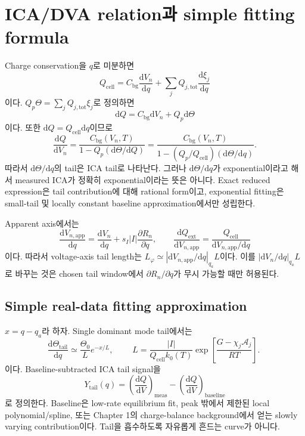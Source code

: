 \documentclass[11pt,a4paper]{article}
\newcommand{\dd}{\mathrm{d}}
\newcommand{\app}{\mathrm{app}}
\newcommand{\bg}{\mathrm{bg}}
\newcommand{\cell}{\mathrm{cell}}
\newcommand{\ext}{\mathrm{ext}}
\newcommand{\tot}{\mathrm{tot}}
\newcommand{\tail}{\mathrm{tail}}
\begin{document}
\section{ICA/DVA relation과 simple fitting formula}\label{sec:fiteq}
Charge conservation을 $q$로 미분하면
\begin{equation}
Q_{\cell}=C_{\bg}\frac{\dd V_n}{\dd q}+\sum_jQ_{j,\tot}\frac{\dd\xi_j}{\dd q}
\end{equation}
이다. $Q_p\Theta=\sum_jQ_{j,\tot}\xi_j$로 정의하면
\begin{equation}
\dd Q=C_{\bg}\dd V_n+Q_p\dd\Theta
\label{eq:dQsplit}
\end{equation}
이다. 또한 $\dd Q=Q_{\cell}\dd q$이므로
\begin{equation}
\boxed{\;\frac{\dd Q}{\dd V_n}=\frac{C_{\bg}(V_n,T)}{1-Q_p(\dd\Theta/\dd Q)}
=\frac{C_{\bg}(V_n,T)}{1-(Q_p/Q_{\cell})(\dd\Theta/\dd q)}.\;}
\label{eq:fiteq}
\end{equation}
따라서 $\dd\Theta/\dd q$의 tail은 ICA tail로 나타난다. 그러나 $\dd\Theta/\dd q$가 exponential이라고 해서 measured ICA가
정확히 exponential이라는 뜻은 아니다. Exact reduced expression은 tail contribution에 대해 rational form이고, exponential fitting은
small-tail 및 locally constant baseline approximation에서만 성립한다.

Apparent axis에서는
\begin{equation}
\frac{\dd V_{n,\app}}{\dd q}=\frac{\dd V_n}{\dd q}+s_I|I|\frac{\partial R_n}{\partial q},
\qquad
\frac{\dd Q_{\ext}}{\dd V_{n,\app}}=\frac{Q_{\cell}}{\dd V_{n,\app}/\dd q}
\label{eq:app_axis}
\end{equation}
이다. 따라서 voltage-axis tail length는 $L_\varphi\simeq |\dd V_{n,\app}/\dd q|_{q_a}L$이다. 이를
$|\dd V_n/\dd q|_{q_a}L$로 바꾸는 것은 chosen tail window에서 $\partial R_n/\partial q$가 무시 가능할 때만 허용된다.

\subsection{Simple real-data fitting approximation}\label{sec:ch1_simplefit}
$x=q-q_a$라 하자. Single dominant mode tail에서는
\begin{equation}
\frac{\dd\Theta_{\tail}}{\dd q}\simeq\frac{\Theta_0}{L}e^{-x/L},
\qquad
\boxed{\;L=\frac{|I|}{Q_{\cell}k_0(T)}
\exp\left[\frac{G-\chi_j\mathcal A_j}{RT}\right].\;}
\label{eq:simplefit}
\end{equation}
이다. Baseline-subtracted ICA tail signal을
\begin{equation}
Y_{\tail}(q)=\left(\frac{\dd Q}{\dd V}\right)_{\mathrm{meas}}
-\left(\frac{\dd Q}{\dd V}\right)_{\mathrm{baseline}}
\label{eq:Ytail_def}
\end{equation}
로 정의한다. Baseline은 low-rate equilibrium fit, peak 밖에서 제한된 local polynomial/spline, 또는 Chapter 1의 charge-balance
background에서 얻는 slowly varying contribution이다. Tail을 흡수하도록 자유롭게 흔드는 curve가 아니다.
\end{document}
